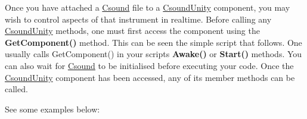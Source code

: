 Once you have attached a \mbox{\hyperlink{namespace_csound}{Csound}} file to a \mbox{\hyperlink{class_csound_unity}{Csound\+Unity}} component, you may wish to control aspects of that instrument in realtime. Before calling any \mbox{\hyperlink{class_csound_unity}{Csound\+Unity}} methods, one must first access the component using the {\bfseries{Get\+Component()}} method. This can be seen the simple script that follows. One usually calls Get\+Component() in your script\textquotesingle{}s {\bfseries{Awake()}} or {\bfseries{Start()}} methods. You can also wait for \mbox{\hyperlink{namespace_csound}{Csound}} to be initialised before executing your code. Once the \mbox{\hyperlink{class_csound_unity}{Csound\+Unity}} component has been accessed, any of its member methods can be called.

See some examples below\+:


\begin{DoxyCode}{0}
\DoxyCodeLine{}
\DoxyCodeLine{\{}
\DoxyCodeLine{\}}
\DoxyCodeLine{}
\DoxyCodeLine{\{}
\DoxyCodeLine{    \textcolor{comment}{// your code}}
\DoxyCodeLine{\}}

\end{DoxyCode}



\begin{DoxyCode}{0}
\DoxyCodeLine{}
\DoxyCodeLine{\{}
\DoxyCodeLine{    \{}
\DoxyCodeLine{    \}}
\DoxyCodeLine{    }
\DoxyCodeLine{    \textcolor{comment}{// your code}}
\DoxyCodeLine{\}}
\DoxyCodeLine{}
\DoxyCodeLine{\textcolor{comment}{// Update is called once per frame}}
\DoxyCodeLine{\{}
\DoxyCodeLine{    \textcolor{comment}{// your code}}
\DoxyCodeLine{\}}

\end{DoxyCode}



